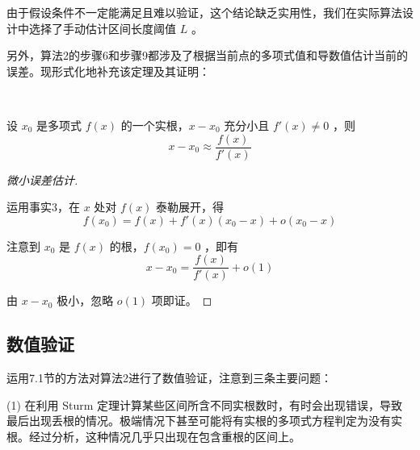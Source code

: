 	由于假设条件不一定能满足且难以验证，这个结论缺乏实用性，我们在实际算法设计中选择了手动估计区间长度阈值 $L$ 。
	
	另外，算法2的步骤6和步骤9都涉及了根据当前点的多项式值和导数值估计当前的误差。现形式化地补充该定理及其证明：
	
	\begin{theorem}[微小误差估计]~
		
		设 $x_0$ 是多项式 $f(x)$ 的一个实根，$x - x_0$ 充分小且 $f'(x) \neq 0$ ，则
		$$
		x - x_0 \approx \frac{f(x)}{f'(x)}
		$$
		
	
	\end{theorem}

	\begin{proof}[微小误差估计]~
	
		运用事实3，在 $x$ 处对 $f(x)$ 泰勒展开，得
		$$
		f(x_0) = f(x) + f'(x)(x_0 - x) + o(x_0 - x)
		$$
		
		注意到 $x_0$ 是 $f(x)$ 的根，$f(x_0) = 0$ ，即有
		$$
		x - x_0 = \frac{f(x)}{f'(x)} + o(1)
		$$
		
		由 $x - x_0$ 极小，忽略 $o(1)$ 项即证。
		\qedhere
		
		
	\end{proof}
\subsection{数值验证}

运用7.1节的方法对算法2进行了数值验证，注意到三条主要问题：

(1) 在利用 Sturm 定理计算某些区间所含不同实根数时，有时会出现错误，导致最后出现丢根的情况。极端情况下甚至可能将有实根的多项式方程判定为没有实根。经过分析，这种情况几乎只出现在包含重根的区间上。

